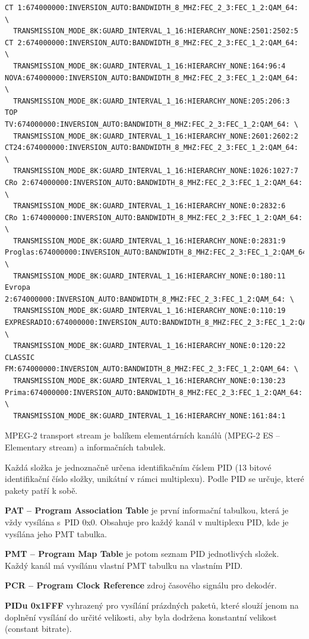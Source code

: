 \begin{small}
\begin{verbatim}
CT 1:674000000:INVERSION_AUTO:BANDWIDTH_8_MHZ:FEC_2_3:FEC_1_2:QAM_64: \
  TRANSMISSION_MODE_8K:GUARD_INTERVAL_1_16:HIERARCHY_NONE:2501:2502:5
CT 2:674000000:INVERSION_AUTO:BANDWIDTH_8_MHZ:FEC_2_3:FEC_1_2:QAM_64: \
  TRANSMISSION_MODE_8K:GUARD_INTERVAL_1_16:HIERARCHY_NONE:164:96:4
NOVA:674000000:INVERSION_AUTO:BANDWIDTH_8_MHZ:FEC_2_3:FEC_1_2:QAM_64: \
  TRANSMISSION_MODE_8K:GUARD_INTERVAL_1_16:HIERARCHY_NONE:205:206:3
TOP TV:674000000:INVERSION_AUTO:BANDWIDTH_8_MHZ:FEC_2_3:FEC_1_2:QAM_64: \
  TRANSMISSION_MODE_8K:GUARD_INTERVAL_1_16:HIERARCHY_NONE:2601:2602:2
CT24:674000000:INVERSION_AUTO:BANDWIDTH_8_MHZ:FEC_2_3:FEC_1_2:QAM_64: \
  TRANSMISSION_MODE_8K:GUARD_INTERVAL_1_16:HIERARCHY_NONE:1026:1027:7
CRo 2:674000000:INVERSION_AUTO:BANDWIDTH_8_MHZ:FEC_2_3:FEC_1_2:QAM_64: \
  TRANSMISSION_MODE_8K:GUARD_INTERVAL_1_16:HIERARCHY_NONE:0:2832:6
CRo 1:674000000:INVERSION_AUTO:BANDWIDTH_8_MHZ:FEC_2_3:FEC_1_2:QAM_64: \
  TRANSMISSION_MODE_8K:GUARD_INTERVAL_1_16:HIERARCHY_NONE:0:2831:9
Proglas:674000000:INVERSION_AUTO:BANDWIDTH_8_MHZ:FEC_2_3:FEC_1_2:QAM_64: \
  TRANSMISSION_MODE_8K:GUARD_INTERVAL_1_16:HIERARCHY_NONE:0:180:11
Evropa 2:674000000:INVERSION_AUTO:BANDWIDTH_8_MHZ:FEC_2_3:FEC_1_2:QAM_64: \
  TRANSMISSION_MODE_8K:GUARD_INTERVAL_1_16:HIERARCHY_NONE:0:110:19
EXPRESRADIO:674000000:INVERSION_AUTO:BANDWIDTH_8_MHZ:FEC_2_3:FEC_1_2:QAM_64: \
  TRANSMISSION_MODE_8K:GUARD_INTERVAL_1_16:HIERARCHY_NONE:0:120:22
CLASSIC FM:674000000:INVERSION_AUTO:BANDWIDTH_8_MHZ:FEC_2_3:FEC_1_2:QAM_64: \
  TRANSMISSION_MODE_8K:GUARD_INTERVAL_1_16:HIERARCHY_NONE:0:130:23
Prima:674000000:INVERSION_AUTO:BANDWIDTH_8_MHZ:FEC_2_3:FEC_1_2:QAM_64: \
  TRANSMISSION_MODE_8K:GUARD_INTERVAL_1_16:HIERARCHY_NONE:161:84:1
\end{verbatim}
\end{small}

MPEG-2 transport stream je balíkem elementárních kanálů (MPEG-2 ES -- Elementary stream) a informačních tabulek.

Každá složka je jednoznačně určena identifikačním číslem PID (13 bitové identifikační číslo složky, unikátní v rámci multiplexu). Podle PID se určuje, které pakety patří k sobě.
\bitem
\item \textbf{PAT -- Program Association Table} je první informační tabulkou, která je vždy vysílána s~PID 0x0. Obsahuje pro každý kanál v multiplexu PID, kde je vysílána jeho PMT tabulka.
\item \textbf{PMT -- Program Map Table} je potom seznam PID jednotlivých složek. Každý kanál má vysílánu vlastní PMT tabulku na vlastním PID.
\item \textbf{PCR -- Program Clock Reference} zdroj časového signálu pro dekodér.
\item \textbf{PIDu 0x1FFF} vyhrazený pro vysílání prázdných paketů, které slouží jenom na doplnění vysílání do určité velikosti, aby byla dodržena konstantní velikost (constant bitrate).
\eitem

